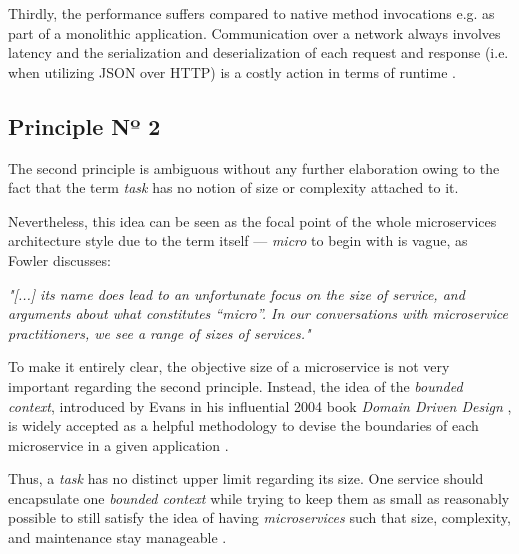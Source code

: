\documentclass[12pt,a4paper]{report}
\begin{document}
Thirdly, the performance suffers compared to native method invocations e.g.
as part of a monolithic application. Communication over a network always
involves latency and the serialization and deserialization
of each request and response (i.e. when utilizing JSON over HTTP)
is a costly action in terms of runtime \cite{newman2015building}.


\subsection{Principle Nº 2} \label{subsect:ms-principle-2}
The second principle is ambiguous without any further elaboration owing to
the fact that the term \textit{task} has no notion of size or complexity
attached to it.

Nevertheless, this idea can be seen as the focal point of the whole microservices
architecture style due to the term itself --- \textit{micro} to begin with
is vague, as Fowler discusses:
\begin{displayquote}
\emph{"[...] its name does lead to an unfortunate focus on the size of service,
and arguments about what constitutes “micro”.
In our conversations with microservice practitioners,
we see a range of sizes of services."}~\cite{ms-fowler}
\end{displayquote}
To make it entirely clear, the objective size of a microservice is not very
important regarding the second principle. Instead, the idea of the
\textit{bounded context}, introduced by Evans in his influential 2004 book
\textit{Domain Driven Design} \cite{evans2004ddd}, is widely accepted as
a helpful methodology to devise the boundaries of each microservice
in a given application \cite{newman2015building, ms-fowler}.

Thus, a \textit{task} has no distinct upper limit regarding its size.
One service should encapsulate one \textit{bounded context} while trying to
keep them as small as reasonably possible to still satisfy the idea of having
\textit{microservices} such that size, complexity, and maintenance stay manageable
\cite{newman2015building, ms-fowler}.
\end{document}
